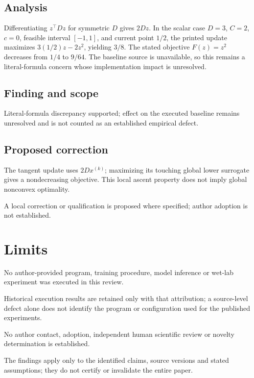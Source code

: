 \documentclass[11pt]{article}
\begin{document}
\subsection*{Analysis}

Differentiating \(z^\top Dz\) for symmetric \(D\) gives \(2Dz\). In the scalar case \(D=3\), \(C=2\), \(c=0\), feasible interval \([-1,1]\), and current point \(1/2\), the printed update maximizes \(3(1/2)z-2z^2\), yielding \(3/8\). The stated objective \(F(z)=z^2\) decreases from \(1/4\) to \(9/64\). The baseline source is unavailable, so this remains a literal-formula concern whose implementation impact is unresolved.

\subsection*{Finding and scope}

Literal-formula discrepancy supported; effect on the executed baseline remains unresolved and is not counted as an established empirical defect.

\subsection*{Proposed correction}

The tangent update uses \(2Dx^{(k)}\); maximizing its touching global lower surrogate gives a nondecreasing objective. This local ascent property does not imply global nonconvex optimality.

A local correction or qualification is proposed where specified; author adoption is not established.

\section*{Limits}

No author-provided program, training procedure, model inference or wet-lab experiment was executed in this review.\par

Historical execution results are retained only with that attribution; a source-level defect alone does not identify the program or configuration used for the published experiments.\par

No author contact, adoption, independent human scientific review or novelty determination is established.\par

The findings apply only to the identified claims, source versions and stated assumptions; they do not certify or invalidate the entire paper.\par
\end{document}

